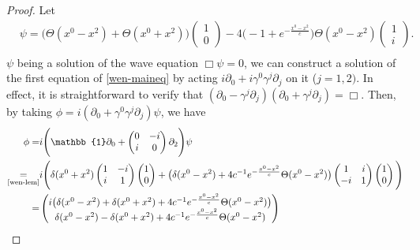 \begin{proof}
Let 
\begin{equation*}
\begin{split}
& \psi = \big(\Theta(x^0 - x^2) + \Theta(x^0 + x^2) \big) 
\begin{pmatrix} 1 \\ 0 \end{pmatrix} 
- 4\big(-1+ e^{-\frac{x^0 - x^2}{c}}\big)\Theta(x^0-x^2)\begin{pmatrix} 1 \\ i \end{pmatrix}. \\
\end{split}
\end{equation*}
$\psi$ being a solution of the wave equation $\Box \psi = 0$,
we can construct a solution of the first equation of \cref{wen-maineq} by acting $i\partial_0 + i\gamma^0\gamma^j \partial_j$ on it ($j= 1, 2)$.
In effect, it is straightforward to verify that $(\partial_0 - \gamma^j\partial_j)(\partial_0 + \gamma^j\partial_j) = \Box$. 
Then, by taking $\phi = i(\partial_0 + \gamma^0\gamma^j\partial_j)\psi$, we have
\begin{equation*}
\begin{split}
\phi = &
i\Bigg(\mathbb{1}\partial_0 + \begin{pmatrix} 0 &-i \\ i &0\end{pmatrix}\partial_2  \Bigg)\psi \\
\underset{\textrm{\cref{wen-lem}}}{=}&
i\Bigg( \delta(x^0 + x^2)\begin{pmatrix} 1 & -i \\ i & 1 \end{pmatrix} \begin{pmatrix}1 \\ 0 \end{pmatrix}
+ \big( \delta(x^0 - x^2) + 4c^{-1} e^{-\frac{x^0-x^2}{c}}\Theta(x^0-x^2)\big)
\begin{pmatrix} 1 & i \\ -i & 1 \end{pmatrix} \begin{pmatrix}1 \\ 0 \end{pmatrix} \Bigg) \\
= &
\begin{pmatrix}
i \big(\delta(x^0 - x^2) + \delta(x^0 + x^2) + 4c^{-1}e^{- \frac{x^0-x^2}{c}}\Theta(x^0-x^2) \big) \\
\delta({x^0 - x^2}) - \delta(x^0 + x^2) + 4c^{-1}e^{- \frac{x^0-x^2}{c}}\Theta(x^0-x^2) \end{pmatrix}

\end{split}
\end{equation*}
\end{proof}
